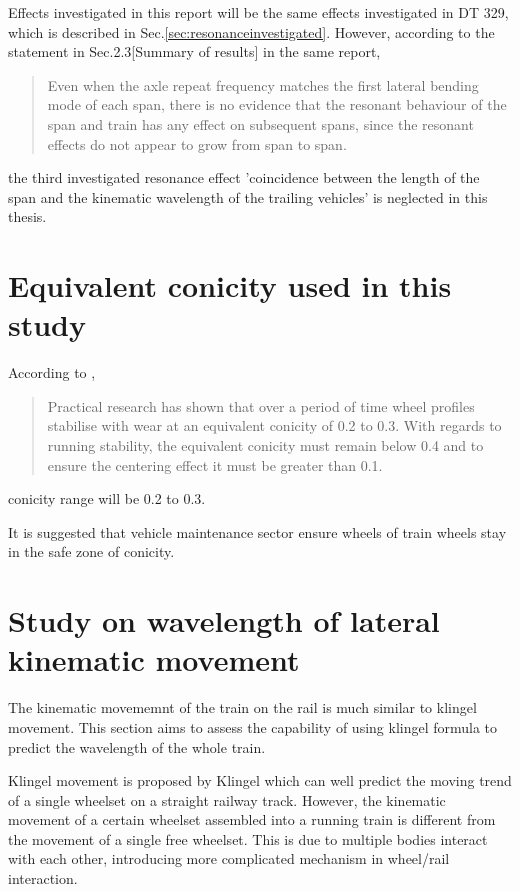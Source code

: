 Effects investigated in this report will be the same effects investigated in DT 329, which is described in Sec.\ref{sec:resonanceinvestigated}. However, according to the statement in Sec.2.3[Summary of results] in the same report,

\begin{quote}
Even when the axle repeat frequency matches the first lateral bending mode of each span, there is no evidence that the resonant behaviour of the span and train has any effect on subsequent spans, since the resonant effects do not appear to grow from span to span.
\end{quote}

the third investigated resonance effect 'coincidence between the length of the span and the kinematic wavelength of the trailing vehicles' is neglected in this thesis. 


\section{Equivalent conicity used in this study}
According to \cite[Section.2.6]{esveld2001modern}, 

\begin{quote}
    Practical research has shown that over a period of time wheel profiles stabilise with wear at an equivalent conicity of 0.2 to 0.3. With regards to running stability, the equivalent conicity must remain below 0.4 and to ensure the centering effect it must be greater than 0.1.
\end{quote}

conicity range will be 0.2 to 0.3.

It is suggested that vehicle maintenance sector ensure wheels of train wheels stay in the safe zone of conicity. 


\section{Study on wavelength of lateral kinematic movement}

The kinematic movememnt of the train on the rail is much similar to klingel movement. This section aims to assess the capability of using klingel formula to predict the wavelength of the whole train.

Klingel movement is proposed by Klingel which can well predict the moving trend of a single wheelset on a straight railway track. However, the kinematic movement of a certain wheelset assembled into a running train is different from the movement of a single free wheelset. This is due to multiple bodies interact with each other, introducing more complicated mechanism in wheel/rail interaction. 

